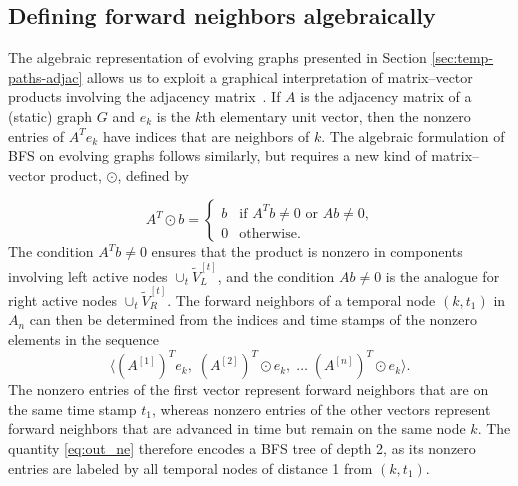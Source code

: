 \documentclass[10pt,conference,compsocconf]{IEEEtran}
\theoremstyle{definition}
\begin{document}
\subsection{Defining forward neighbors algebraically}


The algebraic representation of evolving graphs presented in Section \ref{sec:temp-paths-adjac}
allows us to exploit a graphical interpretation of
matrix--vector products involving the adjacency matrix~\cite{kegi11}.
If $A$ is the adjacency matrix of a (static) graph $G$ and $e_k$ is the $k$th
elementary unit vector, then the nonzero entries of $A^T e_k$ have indices that
are neighbors of $k$.
The algebraic formulation of BFS on evolving graphs follows similarly, but
requires a new kind of matrix--vector product, $\odot$, defined by

\[
A^T \!\odot b =
\begin{cases}
b & \mbox{if $A^Tb \ne 0$ or $Ab \ne 0$,} \\
0 & \mbox{otherwise.}
\end{cases}
\]
The condition $A^Tb \ne 0$ ensures that the product is nonzero in components
involving left active nodes $\cup_t \tilde V_L^{[t]}$, and the condition
$Ab \ne 0$ is the analogue for right active nodes $\cup_t \tilde V_R^{[t]}$.
The forward neighbors of a temporal node $(k, t_1)$ in $A_n$ can then be determined
from the indices and time stamps of the nonzero elements in the sequence
\begin{equation}
\label{eq:out_ne}
\big\langle (A^{[1]})^Te_k, \; (A^{[2]})^T\!\odot e_k, \; \ldots \; (A^{[n]})^T\!\odot e_k\big\rangle.
\end{equation}
The nonzero entries of the first vector represent forward neighbors that are on
the same time stamp $t_1$, whereas nonzero entries of the other vectors represent forward
neighbors that are advanced in time but remain on the same node $k$.
The quantity \eqref{eq:out_ne} therefore encodes a BFS tree of depth 2,
as its nonzero entries are labeled by all temporal nodes of distance 1 from
$(k, t_1)$.
\end{document}
